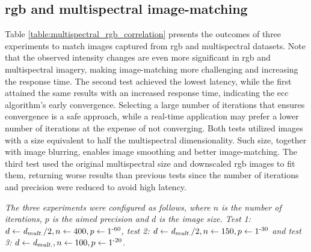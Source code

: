 \renewcommand{\arraystretch}{1}

\subsection{\acrshort{rgb} and multispectral image-matching}

Table \ref{table:multispectral_rgb_correlation} presents the outcomes of three experiments to match images captured from \acrshort{rgb} and multispectral datasets. Note that the observed intensity changes are even more significant in \acrshort{rgb} and multispectral imagery, making image-matching more challenging and increasing the response time. The second test achieved the lowest latency, while the first attained the same results with an increased response time, indicating the \acrshort{ecc} algorithm's early convergence. Selecting a large number of iterations that ensures convergence is a safe approach, while a real-time application may prefer a lower number of iterations at the expense of not converging. Both tests utilized images with a size equivalent to half the multispectral dimensionality. Such size, together with image blurring, enables image smoothing and better image-matching. The third test used the original multispectral size and downscaled \acrshort{rgb} images to fit them, returning worse results than previous tests since the number of iterations and precision were reduced to avoid high latency.

\textit{The three experiments were configured as follows, where $n$ is the number of iterations, $p$ is the aimed precision and $d$ is the image size. Test 1: $d \gets \textit{d}_{\textit{mult.}} / 2, n \gets 400, p \gets 1\textsuperscript{-60}$, test 2: $d \gets \textit{d}_{\textit{mult.}} / 2, n \gets 150, p \gets 1\textsuperscript{-30}$ and test 3: $d \gets \textit{d}_{\textit{mult.}}, n \gets 100, p \gets 1\textsuperscript{-20}$}.

